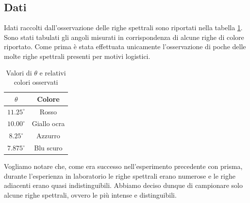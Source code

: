\documentclass[a4paper]{article}
\begin{document}
\subsection{Dati}
Idati raccolti dall'osservazione delle righe spettrali sono riportati nella tabella \ref{tab: angolo e colore gas ignoto reticolo}. Sono stati tabulati gli angoli misurati in corrispondenza di alcune righe di colore riportato. Come prima è stata effettuata unicamente l'osservazione di poche delle molte righe spettrali presenti per motivi logistici.
\begin{table}[h]
\centering
\begin{tabular}{|c|c|}
\hline
$\theta$ & Colore \\ \hline
$11.25^\circ$ & Rosso \\
$10.00^\circ$ & Giallo ocra \\
$8.25^\circ$  & Azzurro \\
$7.875^\circ$ & Blu scuro \\
\hline
\end{tabular}
\caption{Valori di $\theta$ e relativi colori osservati}
\label{tab: angolo e colore gas ignoto reticolo}
\end{table}
Vogliamo notare che, come era successo nell'esperimento precedente con prisma, durante l'esperienza in laboratorio le righe spettrali erano numerose e le righe adiacenti erano quasi indistinguibili. Abbiamo deciso dunque di campionare solo alcune righe spettrali, ovvero le più intense e distinguibili. 
\end{document}
